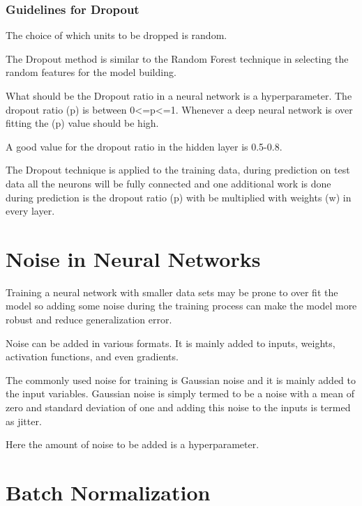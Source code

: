 	\subsubsection{Guidelines for Dropout}
	\begin{bulletedlist}
		\item The choice of which units to be dropped is random.
		\item The Dropout method is similar to the Random Forest technique in selecting the random features for the model building.
		\item What should be the Dropout ratio in a neural network is a hyperparameter. The dropout ratio (p) is between 0<=p<=1. Whenever a deep neural network is over fitting the (p) value should be high.
		\item A good value for the dropout ratio in the hidden layer is 0.5-0.8.
		\item The Dropout technique is applied to the training data, during prediction on test data all the neurons will be fully connected and one additional work is done during prediction is the dropout ratio (p) with be multiplied with weights (w) in every layer.
	\end{bulletedlist}

	\section{Noise in Neural Networks}
	\begin{bulletedlist}
		\item Training a neural network with smaller data sets may be prone to over fit the model so adding some noise during the training process can make the model more robust and reduce generalization error.
		\item Noise can be added in various formats. It is mainly added to inputs, weights, activation functions, and even gradients.
		\item The commonly used noise for training is Gaussian noise and it is mainly added to the input variables. Gaussian noise is simply termed to be a noise with a mean of zero and standard deviation of one and adding this noise to the inputs is termed as jitter.
		\item Here the amount of noise to be added is a hyperparameter.
	\end{bulletedlist}

	\section{Batch Normalization}

